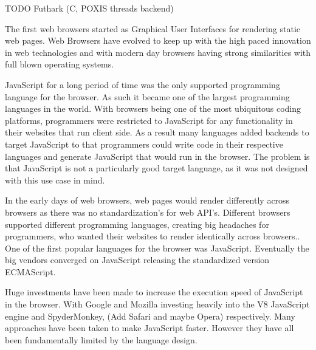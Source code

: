 \documentclass[11pt]{book}
\begin{document}

TODO Futhark (C, POXIS threads backend)



The first web browsers started as Graphical User Interfaces for rendering static web pages. Web Browsers have evolved to keep up with the high paced innovation in web technologies and with modern day browsers having strong similarities with full blown operating systems. 


JavaScript for a long period of time was the only supported programming language for the browser. As such it became one of the largest programming languages in the world. With browsers being one of the most ubiquitous coding platforms, programmers were restricted to JavaScript for any functionality in their websites that run client side. As a result many languages added backends to target JavaScript to that programmers could write code in their respective languages and generate JavaScript that would run in the browser. The problem is that JavaScript is not a particularly good target language, as it was not designed with this use case in mind. 

In the early days of web browsers, web pages would render differently across browsers as there was no standardization's for web API's. Different browsers supported different programming languages, creating big headaches for programmers, who wanted their websites to render identically across browsers.. One of the first popular languages for the browser was JavaScript. Eventually the big vendors converged on JavaScript releasing the standardized version ECMAScript. 

Huge investments have been made to increase the execution speed of JavaScript in the browser. With Google and Mozilla investing heavily into the V8 JavaScript engine and SpyderMonkey, (Add Safari and maybe Opera) respectively. Many approaches have been taken to make JavaScript faster. However they have all been fundamentally limited by the language design. 
\end{document}
